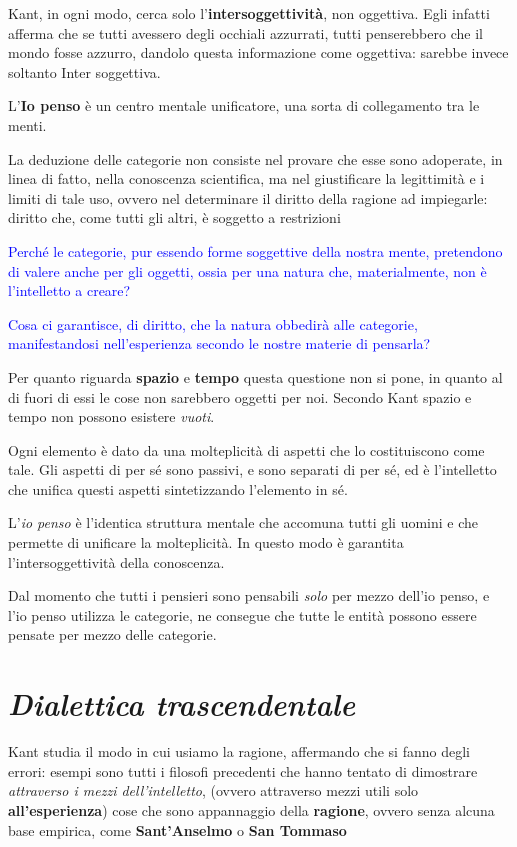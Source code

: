 \documentclass[a4paper, twoside, titlepage]{book}
\renewcommand{\emph}[1]{\textcolor{blue}{#1}}
\begin{document}
Kant, in ogni modo, cerca solo l’\textbf{intersoggettività}, non oggettiva. Egli infatti afferma che se tutti avessero degli occhiali azzurrati, tutti penserebbero che il mondo fosse azzurro, dandolo questa informazione come oggettiva: sarebbe invece soltanto Inter soggettiva.

L’\textbf{Io penso} è un centro mentale unificatore, una sorta di collegamento tra le menti.

La deduzione delle categorie non consiste nel provare che esse sono adoperate, in linea di fatto, nella conoscenza scientifica, ma nel giustificare la legittimità e i limiti di tale uso, ovvero nel determinare il diritto della ragione ad impiegarle: diritto che, come tutti gli altri, è soggetto a restrizioni

\emph{Perché le categorie, pur essendo forme soggettive della nostra mente, pretendono di valere anche per gli oggetti, ossia per una natura che, materialmente, non è l’intelletto a creare?}

\emph{Cosa ci garantisce, di diritto, che la natura obbedirà alle categorie, manifestandosi nell’esperienza secondo le nostre materie di pensarla?}

Per quanto riguarda \textbf{spazio} e \textbf{tempo} questa questione non si pone, in quanto al di fuori di essi le cose non sarebbero oggetti per noi.
Secondo Kant spazio e tempo non possono esistere \textit{vuoti}.

Ogni elemento è dato da una molteplicità di aspetti che lo costituiscono come tale. Gli aspetti di per sé sono passivi, e sono separati di per sé, ed è l’intelletto che unifica questi aspetti sintetizzando l’elemento in sé.

L’\textit{io penso} è l’identica struttura mentale che accomuna tutti gli uomini e che permette di unificare la molteplicità. In questo modo è garantita l’intersoggettività della conoscenza.

Dal momento che tutti i pensieri sono pensabili \textit{solo} per mezzo dell’io penso, e l’io penso utilizza le categorie, ne consegue che tutte le entità possono essere pensate per mezzo delle categorie.

\section{\textit{Dialettica trascendentale}}

Kant studia il modo in cui usiamo la ragione, affermando che si fanno degli errori: esempi sono tutti i filosofi precedenti che hanno tentato di dimostrare \textit{attraverso i mezzi dell’intelletto}, (ovvero attraverso mezzi utili solo \textbf{all’esperienza}) cose che sono appannaggio della \textbf{ragione}, ovvero senza alcuna base empirica, come \textbf{Sant’Anselmo} o \textbf{San Tommaso}
\end{document}
